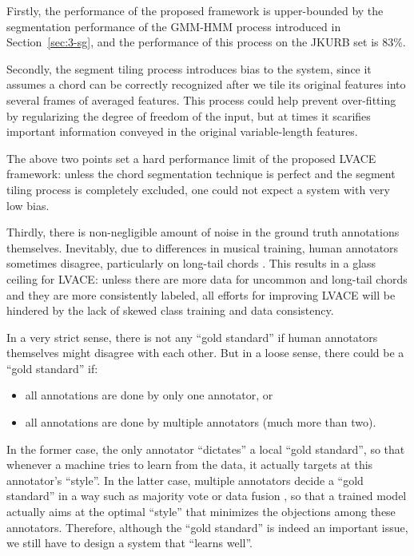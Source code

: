 Firstly, the performance of the proposed framework is upper-bounded by the segmentation performance of the GMM-HMM process introduced in Section~\ref{sec:3-sg}, and the performance of this process on the JKURB set is 83\%.

Secondly, the segment tiling process introduces bias to the system, since it assumes a chord can be correctly recognized after we tile its original features into several frames of averaged features. This process could help prevent over-fitting by regularizing the degree of freedom of the input, but at times it scarifies important information conveyed in the original variable-length features.

The above two points set a hard performance limit of the proposed LVACE framework: unless the chord segmentation technique is perfect and the segment tiling process is completely excluded, one could not expect a system with very low bias.

Thirdly, there is non-negligible amount of noise in the ground truth annotations themselves. Inevitably, due to differences in musical training, human annotators sometimes disagree, particularly on long-tail chords \cite{humphreyfour}. This results in a glass ceiling for LVACE: unless there are more data for uncommon and long-tail chords and they are more consistently labeled, all efforts for improving LVACE will be hindered by the lack of skewed class training and data consistency.

In a very strict sense, there is not any ``gold standard'' if human annotators themselves might disagree with each other. But in a loose sense, there could be a ``gold standard'' if:
\begin{itemize}
	\item all annotations are done by only one annotator, or
	\item all annotations are done by multiple annotators (much more than two).
\end{itemize}
In the former case, the only annotator ``dictates'' a local ``gold standard'', so that whenever a machine tries to learn from the data, it actually targets at this annotator's ``style''. In the latter case, multiple annotators decide a ``gold standard'' in a way such as majority vote or data fusion \cite{koopsintegration,klein2004sensor}, so that a trained model actually aims at the optimal ``style'' that minimizes the objections among these annotators. Therefore, although the ``gold standard'' is indeed an important issue, we still have to design a system that ``learns well''.


